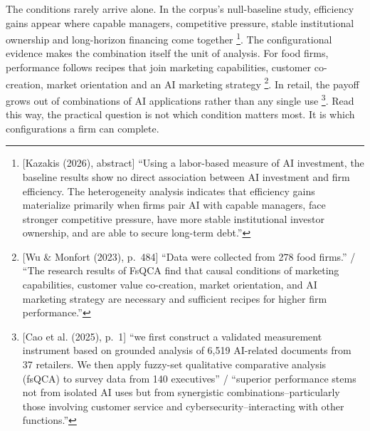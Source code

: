 The conditions rarely arrive alone. In the corpus's null-baseline study, efficiency
gains appear where capable managers, competitive pressure, stable institutional
ownership and long-horizon financing come together
\parencite[abstract]{kazakis2026conditional}\footnote{[Kazakis (2026), abstract]
``Using a labor-based measure of AI investment, the baseline results show no direct
association between AI investment and firm efficiency. The heterogeneity analysis
indicates that efficiency gains materialize primarily when firms pair AI with capable
managers, face stronger competitive pressure, have more stable institutional investor
ownership, and are able to secure long-term debt.''}. The configurational evidence
makes the combination itself the unit of analysis. For food firms, performance follows
recipes that join marketing capabilities, customer co-creation, market orientation and
an AI marketing strategy \parencite[p.~484]{wu2023role}\footnote{[Wu \& Monfort (2023),
p.~484] ``Data were collected from 278 food firms.'' / ``The research results of FsQCA
find that causal conditions of marketing capabilities, customer value co-creation,
market orientation, and AI marketing strategy are necessary and sufficient recipes for
higher firm performance.''}. In retail, the payoff grows out of combinations of AI
applications rather than any single
use \parencite[p.~1]{cao2025managing}\footnote{[Cao et al. (2025), p.~1] ``we first
construct a validated measurement instrument based on grounded analysis of 6,519
AI-related documents from 37 retailers. We then apply fuzzy-set qualitative comparative
analysis (fsQCA) to survey data from 140 executives'' / ``superior performance stems
not from isolated AI uses but from synergistic combinations--particularly those
involving customer service and cybersecurity--interacting with other functions.''}.
Read this way, the practical question is not which condition
matters most. It is which configurations a firm can complete.

